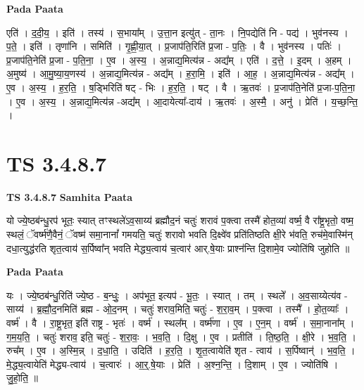 \documentclass[17pt]{extarticle}
\begin{document}
\textbf{Pada Paata} \newline

एति॑ । द॒दी॒य॒ । इति॑ । तस्य॑ । स॒भाया᳚म् । उ॒त्ता॒न इत्यु॑त् - ता॒नः । नि॒पद्येति॑ नि - पद्य॑ । भुव॑नस्य । प॒ते॒ । इति॑ । तृणा॑नि । समिति॑ । गृ॒ह्णी॒या॒त् । प्र॒जाप॑ति॒रिति॑ प्र॒जा - प॒तिः॒ । वै । भुव॑नस्य । पतिः॑ । प्र॒जाप॑ति॒नेति॑ प्र॒जा - प॒ति॒ना॒ । ए॒व । अ॒स्य॒ । अ॒न्नाद्य॒मित्य॑न्न - अद्य᳚म् । एति॑ । द॒त्ते॒ । इ॒दम् । अ॒हम् । अ॒मुष्य॑ । आ॒मु॒ष्या॒य॒णस्य॑ । अ॒न्नाद्य॒मित्य॑न्न - अद्य᳚म् । ह॒रा॒मि॒ । इति॑ । आ॒ह॒ । अ॒न्नाद्य॒मित्य॑न्न - अद्य᳚म् । ए॒व । अ॒स्य॒ । ह॒र॒ति॒ । ष॒ड्भिरिति॑ षट् - भिः । ह॒र॒ति॒ । षट् । वै । ऋ॒तवः॑ । प्र॒जाप॑ति॒नेति॑ प्र॒जा-प॒ति॒ना॒ । ए॒व । अ॒स्य॒ । अ॒न्नाद्य॒मित्य॑न्न -अद्य᳚म् । आ॒दायेत्या᳚-दाय॑ । ऋ॒तवः॑ । अ॒स्मै॒ । अनु॑ । प्रेति॑ । य॒च्छ॒न्ति॒ ।  \newline





\section{ TS 3.4.8.7 }

\textbf{TS 3.4.8.7 } \newline
\textbf{Samhita Paata} \newline

यो ज्ये॒ष्ठब॑न्धु॒रप॑ भूतः॒ स्यात् तꣳस्थले॑ऽव॒साय्य॑ ब्रह्मौद॒नं चतुः॑ शरावं प॒क्त्वा तस्मै॑ होत॒व्या॑ वर्ष्म॒ वै रा᳚ष्ट्र॒भृतो॒ वष्म॒ स्थलं॒ ॅवर्ष्म॑णै॒वैनं॒ ॅवष्म॑ समा॒नानां᳚ गमयति॒ चतुः॑ शरावो भवति दि॒क्ष्वे॑व प्रति॑तिष्ठति क्षी॒रे भ॑वति॒ रुच॑मे॒वास्मि॑न् दधा॒त्युद्ध॑रति शृत॒त्वाय॑ स॒र्पिष्वा᳚न् भवति मेद्ध्य॒त्वाय॑ च॒त्वार॑ आर्.षे॒याः प्राश्न॑न्ति दि॒शामे॒व ज्योति॑षि जुहोति ॥ \newline

\textbf{Pada Paata} \newline

यः । ज्ये॒ष्ठब॑न्धु॒रिति॑ ज्ये॒ष्ठ - ब॒न्धुः॒ । अप॑भूत॒ इत्यप॑ - भू॒तः॒ । स्यात् । तम् । स्थले᳚ । अ॒व॒साय्येत्य॑व - साय्य॑ । ब्र॒ह्मौ॒द॒नमिति॑ ब्रह्म - ओ॒द॒नम् । चतुः॑ शराव॒मिति॒ चतुः॑ - श॒रा॒व॒म् । प॒क्त्वा । तस्मै᳚ । हो॒त॒व्याः᳚ । वर्ष्म॑ । वै । रा॒ष्ट्र॒भृत॒ इति॑ राष्ट्र - भृतः॑ । वर्ष्म॑ । स्थल᳚म् । वर्ष्म॑णा । ए॒व । ए॒न॒म् । वर्ष्म॑ । स॒मा॒नाना᳚म् । ग॒म॒य॒ति॒ । चतुः॑ शराव॒ इति॒ चतुः॑ - श॒रा॒वः॒ । भ॒व॒ति॒ । दि॒क्षु । ए॒व । प्रतीति॑ । ति॒ष्ठ॒ति॒ । क्षी॒रे । भ॒व॒ति॒ । रुच᳚म् । ए॒व । अ॒स्मि॒न्न् । द॒धा॒ति॒ । उदिति॑ । ह॒र॒ति॒ । शृ॒त॒त्वायेति॑ शृत - त्वाय॑ । स॒र्पिष्वान्॑ । भ॒व॒ति॒ । मे॒द्ध्य॒त्वायेति॑ मेद्ध्य-त्वाय॑ । च॒त्वारः॑ । आ॒र्॒.षे॒याः । प्रेति॑ । अ॒श्न॒न्ति॒ । दि॒शाम् । ए॒व । ज्योति॑षि । जु॒हो॒ति॒ ॥  \newline
\end{document}
